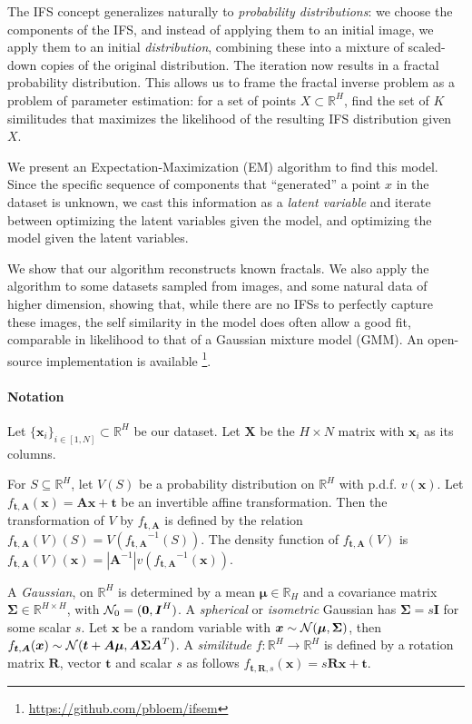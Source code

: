 \documentclass[reprint,amsmath,amssymb,aps,prl]{revtex4-1}
\newcommand{\R}{\mathbb{R}}
\newcommand{\cN}{{\cal N}}
\newcommand{\bx}{\boldsymbol x}
\newcommand{\bX}{\boldsymbol X}
\newcommand{\bt}{\boldsymbol t}
\newcommand{\bA}{\boldsymbol A}
\newcommand{\bmu}{\boldsymbol \mu}
\newcommand{\bSig}{\boldsymbol \Sigma}
\newcommand{\bI}{\boldsymbol I}
\newcommand{\bR}{\boldsymbol R}
\begin{document}
The IFS concept generalizes naturally to \emph{probability distributions}: we choose the components of the IFS, and instead of applying them to an initial image, we apply them to an initial \emph{distribution}, combining these into a mixture of scaled-down copies of the original distribution. The iteration now results in a fractal probability distribution. This allows us to frame the fractal inverse problem as a problem of parameter estimation: for a set of points $X \subset \R^H$, find the set of $K$ similitudes that maximizes the likelihood  of the resulting IFS distribution given $X$. 

We present an Expectation-Maximization (EM) algorithm \cite{dempster1977maximum} to find this model. Since the specific sequence of components that ``generated'' a point $x$ in the dataset is unknown, we cast this information as a \emph{latent variable} and iterate between optimizing the latent variables given the model, and optimizing the model given the latent variables. 

We show that our algorithm reconstructs known fractals. We also apply the algorithm to some datasets sampled from images, and some natural data of higher dimension, showing that, while there are no IFSs to perfectly capture these images, the self similarity in the model does often allow a good fit, comparable in likelihood to that of a Gaussian mixture model (GMM). An open-source implementation is available \footnote{\url{https://github.com/pbloem/ifsem}}.



\paragraph{Notation} 

Let $\{\bx_i\}_{i\in[1,N]} \subset \R^H$ be our dataset. Let $\bX$ be the $H\times N$ matrix with $\bx_i$ as its columns. 

For $S \subseteq \R^H$, let $V(S)$ be a probability distribution on $\R^H$ with p.d.f. $v(\bx)$. Let $f_{\bt, \bA}(\bx) = \bA\bx + \bt$ be an invertible affine transformation. Then the transformation of $V$ by $f_{\bt, \bA}$ is defined by the relation $f_{\bt, \bA}(V)(S) = V({f_{\bt, \bA}}^{-1}(S))$. The density function of $f_{\bt, \bA}(V)$ is $f_{\bt, \bA}(V)(\bx) = |\bA^{-1}| v({f_{\bt, \bA}}^{-1}(\bx))$.

A \emph{Gaussian}, on $\R^H$ is determined by a mean $\bmu \in \R_H$ and a covariance matrix $\bSig \in \R^{H\times H}$, with $\cN_0 = (\boldsymbol 0, \bI^H)$. A \emph{spherical} or \emph{isometric} Gaussian has $\bSig = s\bI$ for some scalar $s$. Let $\bx$ be a random variable with $\bx \sim \cN(\bmu, \bSig)$, then $f_{\bt, \bA}(\bx) \sim \cN(\bt + \bA\bmu, \bA\bSig \bA^T)$.
A \emph{similitude} $f:\R^H \to \R^H$ is defined by a rotation matrix $\bR$, vector $\bt$ and scalar $s$ as follows $f_{\bt, \bR, s}(\bx) = s\bR \bx + \bt$.
\end{document}
